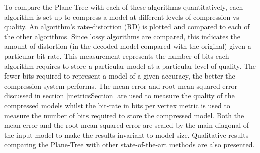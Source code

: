 To compare the Plane-Tree with each of these algorithms quantitatively, each algorithm is set-up to compress a model at different levels of compression vs quality. An algorithm's rate-distortion (RD) is plotted and compared to each of the other algorithms. Since lossy algorithms are compared, this indicates the amount of distortion (in the decoded model compared with the original) given a particular bit-rate. This measurement represents the number of bits each algorithm requires to store a particular model at a particular level of quality. The fewer bits required to represent a model of a given accuracy, the better the compression system performs. The mean error and root mean squared error discussed in section \ref{metricsSection} are used to measure the quality of the compressed models whilst the bit-rate in bits per vertex metric is used to measure the number of bits required to store the compressed model. Both the mean error and the root mean squared error are scaled by the main diagonal of the input model to make the results invariant to model size. Qualitative results comparing the Plane-Tree with other state-of-the-art methods are also presented. \\

